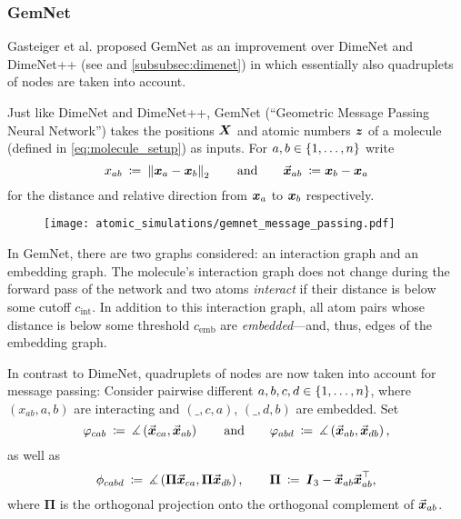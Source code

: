 \subsubsection{GemNet}
\label{subsubsec:gemnet}

Gasteiger et al. proposed GemNet \cite{https://doi.org/10.48550/arxiv.2106.08903} 
as an improvement over DimeNet and DimeNet++ (see 
\cite{DBLP:journals/corr/abs-2003-03123, https://doi.org/10.48550/arxiv.2011.14115} 
and \ref{subsubsec:dimenet}) in which essentially also quadruplets of nodes are
taken into account. 

Just like DimeNet and DimeNet++, GemNet (\enquote{Geometric Message Passing Neural Network}) takes the positions $\boldsymbol{X}$ and atomic numbers 
$\boldsymbol{z}$ of a molecule (defined in \eqref{eq:molecule_setup}) as inputs. For
$a, b \in \left\{1, \dots, n\right\}$ write
\[
    x_{ab} \: \coloneqq \: \left\lVert\boldsymbol{x}_a - \boldsymbol{x}_b\right\rVert_2 
    \qquad \text{and} \qquad 
    \vec{\boldsymbol{x}}_{ab} \: \coloneqq \boldsymbol{x}_b - \boldsymbol{x}_a
\]
for the distance and relative direction from $\boldsymbol{x}_a$ to $\boldsymbol{x}_b$ respectively.
\begin{wrapfigure}{r}{0.3\textwidth}
    \centering
    \texttt{[image: atomic\_simulations/gemnet\_message\_passing.pdf]}
\end{wrapfigure}
In GemNet, there are two graphs considered: an interaction graph and an embedding graph.
The molecule's interaction graph does not change during the forward pass of the network and 
two atoms \textit{interact} if their distance is below some 
cutoff $c_{\text{int}}$. In addition to this interaction graph, all atom pairs 
whose distance is below some threshold $c_{\text{emb}}$ are \textit{embedded}---and, thus, edges 
of the embedding graph.

In contrast to DimeNet, quadruplets of 
nodes are now taken into account for message passing: Consider pairwise different $a, b, c, d \in \left\{1, \dots, n\right\}$,
where $(x_{ab}, a, b)$ are interacting and $(\_, c, a)$, $(\_, d, b)$ are
embedded. Set
\[
    \varphi_{cab} \: \coloneqq \: 
    \measuredangle \left( \vec{\boldsymbol{x}}_{ca}, \vec{\boldsymbol{x}}_{ab} \right)
    \qquad \text{and} \qquad
    \varphi_{abd} \: \coloneqq \: 
    \measuredangle \left( \vec{\boldsymbol{x}}_{ab}, \vec{\boldsymbol{x}}_{db} \right) \text{,}
\]
as well as 
\[
    \phi_{cabd} \: \coloneqq \: \measuredangle \left( \boldsymbol{\Pi} \vec{\boldsymbol{x}}_{ca}, \boldsymbol{\Pi} \vec{\boldsymbol{x}}_{db} \right),
    \qquad \boldsymbol{\Pi} \: \coloneqq \: \boldsymbol{I}_3 - \vec{\boldsymbol{x}}_{ab} \vec{\boldsymbol{x}}_{ab}^\top \text{,}
\]
where $\boldsymbol{\Pi}$ is the orthogonal projection onto the orthogonal
complement of $\vec{\boldsymbol{x}}_{ab}$.

